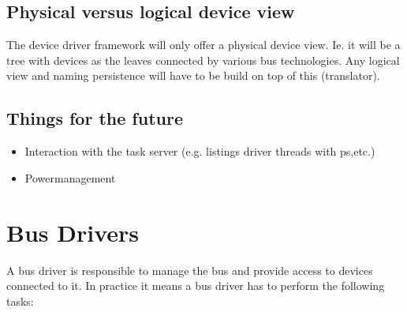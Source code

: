 \subsection{Physical versus logical device view}

The device driver framework will only offer a physical device view.
Ie. it will be a tree with devices as the leaves connected by
various bus technologies.  Any logical view and naming persistence
will have to be build on top of this (translator).

\subsection{Things for the future}

\begin{itemize}
\item Interaction with the task server (e.g. listings driver threads 
  with ps,etc.)
\item Powermanagement
\end{itemize}


\section{Bus Drivers}

A bus driver is responsible to manage the bus and provide access to
devices connected to it.  In practice it means a bus driver has to
perform the following tasks:

